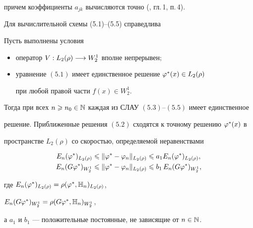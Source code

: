 причем коэффициенты $a_{jk}$ вычисляются точно (\cite{4}, гл.\,1, п.\,4).





Для вычислительной схемы (5.1)--(5.5) справедлива








\begin{thm}


Пусть выполнены условия


\begin{itemize}


\item[а)] оператор $V : L_2(\rho) \longrightarrow W_2^1$ вполне непрерывен$;$


\item[б)] уравнение $(5.1)$ имеет единственное решение $\varphi^*(x)\in L_2(\rho)$


при любой правой части $f(x)\in W_2^1$.


\end{itemize}





Тогда при всех $n\geqslant n_0\in \Bbb{N}$ каждая из СЛАУ $(5.3)$--$(5.5)$ имеет единственное


решение. Приближенные решения $(5.2)$ сходятся к точному решению $\varphi^*(x)$ в


пространстве $L_2(\rho)$ со скоростью, определяемой неравенствами


\begin{align}


E_n(\vp^*)_{L_2(\rho)}&\lea\|\vp^*-\vp_n\|_{L_2(\rho)}\lea a_1


E_n(\vp^*)_{L_2(\rho)}, \\


%


E_n(G\vp^*)_{W_2^1}&\lea\|\vp^*-\vp_n\|_{L_2(\rho)}\lea b_1\, E_n(G\vp^*)_{W_2^1},


\end{align}


где $E_n(\varphi^*)_{L_2(\rho)}=\rho(\varphi^*,\Bbb{H}_n)_{L_2(\rho)}$,


$E_n(G\varphi^*)_{W_2^1}=\rho(G\varphi^*,\Bbb{H}_n)_{W_2^1}$,


а $a_1$ и $b_1$ --- положительные постоянные, не зависящие от $n\in \Bbb{N}$.


\end{thm}








